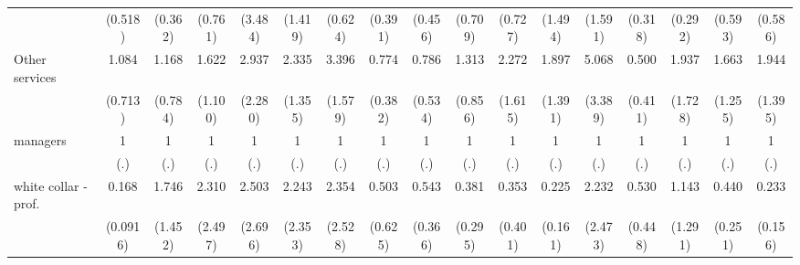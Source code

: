 {\begin{tabular}{l*{16}{c}}
                    &     (0.518)         &     (0.362)         &     (0.761)         &     (3.484)         &     (1.419)         &     (0.624)         &     (0.391)         &     (0.456)         &     (0.709)         &     (0.727)         &     (1.494)         &     (1.591)         &     (0.318)         &     (0.292)         &     (0.593)         &     (0.586)         \\
[1em]
Other services      &       1.084         &       1.168         &       1.622         &       2.937         &       2.335         &       3.396\sym{**} &       0.774         &       0.786         &       1.313         &       2.272         &       1.897         &       5.068\sym{*}  &       0.500         &       1.937         &       1.663         &       1.944         \\
                    &     (0.713)         &     (0.784)         &     (1.100)         &     (2.280)         &     (1.355)         &     (1.579)         &     (0.382)         &     (0.534)         &     (0.856)         &     (1.615)         &     (1.391)         &     (3.389)         &     (0.411)         &     (1.728)         &     (1.255)         &     (1.395)         \\
[1em]
managers            &           1         &           1         &           1         &           1         &           1         &           1         &           1         &           1         &           1         &           1         &           1         &           1         &           1         &           1         &           1         &           1         \\
                    &         (.)         &         (.)         &         (.)         &         (.)         &         (.)         &         (.)         &         (.)         &         (.)         &         (.)         &         (.)         &         (.)         &         (.)         &         (.)         &         (.)         &         (.)         &         (.)         \\
[1em]
white collar - prof.&       0.168\sym{**} &       1.746         &       2.310         &       2.503         &       2.243         &       2.354         &       0.503         &       0.543         &       0.381         &       0.353         &       0.225\sym{*}  &       2.232         &       0.530         &       1.143         &       0.440         &       0.233\sym{*}  \\
                    &    (0.0916)         &     (1.452)         &     (2.497)         &     (2.696)         &     (2.353)         &     (2.528)         &     (0.625)         &     (0.366)         &     (0.295)         &     (0.401)         &     (0.161)         &     (2.473)         &     (0.448)         &     (1.291)         &     (0.251)         &     (0.156)         \\

\end{tabular}}
